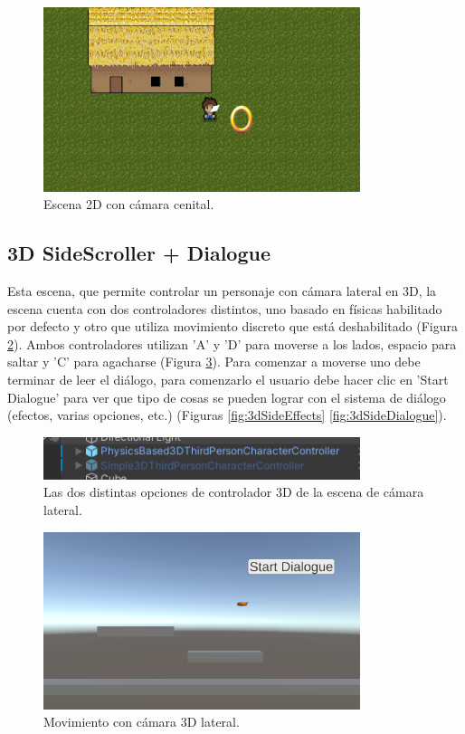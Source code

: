 \begin{figure}[H]
   \centering
     \includegraphics[width=350px,clip=true]{2dTopDownControllerTestScene.png}
   \caption{Escena 2D con cámara cenital.}
   \label{fig:2dtopDown}
\end{figure}

\subsection{3D SideScroller + Dialogue}
Esta escena, que permite controlar un personaje con cámara lateral en 3D, la escena cuenta con dos controladores distintos, uno basado en físicas habilitado por 
defecto y otro que utiliza movimiento discreto que está deshabilitado (Figura \ref{fig:3dSideControllers}). Ambos controladores utilizan 'A' y 'D' para moverse a los 
lados, espacio para saltar y 'C' para agacharse (Figura \ref{fig:3dSideMovement}). Para comenzar a moverse uno debe terminar de leer el diálogo, para 
comenzarlo el usuario debe hacer clic en 'Start Dialogue' para ver que tipo de cosas se pueden lograr con el sistema de diálogo (efectos, varias opciones, 
etc.) (Figuras \ref{fig:3dSideEffects} \ref{fig:3dSideDialogue}). 

 \begin{figure}[H]
   \centering
     \includegraphics[width=350px,clip=true]{3DSideScrollerMovementControllerOptionsTestScene.png}
   \caption{Las dos distintas opciones de controlador 3D de la escena de cámara lateral.}
   \label{fig:3dSideControllers}
\end{figure}
 
\begin{figure}[H]
   \centering
     \includegraphics[width=350px,clip=true]{3DSideScrollerMovementControllerTestScene.png}
   \caption{Movimiento con cámara 3D lateral.}
   \label{fig:3dSideMovement}
\end{figure}

